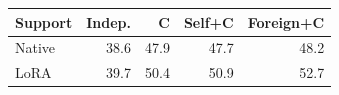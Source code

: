 \begin{tabular}{@{}lrrrr@{}}
\toprule
Support & Indep. & C & Self+C & Foreign+C\\
\midrule
Native & 38.6 & 47.9 & 47.7 & 48.2\\
LoRA & 39.7 & 50.4 & 50.9 & 52.7\\
\bottomrule
\end{tabular}
